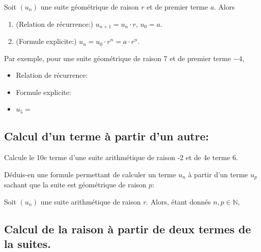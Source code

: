 \documentclass[a4paper,12pt]{report}
\newcommand{\IN}{\mathbb{N}}
\begin{document}
\begin{propriete}
Soit \((u_n)\) une suite géométrique de raison \(r\) et de premier terme \(a\). Alors

\begin{enumerate}
\item (Relation de récurrence:) \(u_{n+1}=u_{n}\cdot r\), \(u_0=a\).
\item (Formule explicite:) \(u_n=u_0\cdot r^n=a\cdot r^n\).
\end{enumerate}
\end{propriete}

Par exemple, pour une suite géométrique de raison 7 et de premier
terme \(-4\),

\begin{itemize}
\item Relation de récurrence: \dotfill

\item Formule explicite:\dotfill

\item \(u_{5}=\) \dotfill
\end{itemize}

\subsection{Calcul d'un terme à partir d'un autre:}
\label{sec:orgc74fcdc}

Calcule le 10e terme d'une suite arithmétique de raison -2 et de 4e
terme 6.

\dotfill

\dotfill

\dotfill

\dotfill

\dotfill

Déduis-en une formule permettant de calculer un terme \(u_n\) à partir
d'un terme \(u_p\) sachant que la suite est géométrique de raison \(p\):

\begin{propriete}


Soit \((u_n)\) une suite arithmétique de raison \(r\).
Alors, étant donnés \(n,p\in\IN\),

\dotfill
\end{propriete}

\subsection{Calcul de la raison à partir de deux termes de la suites.}
\label{sec:org43ddc16}
\end{document}
